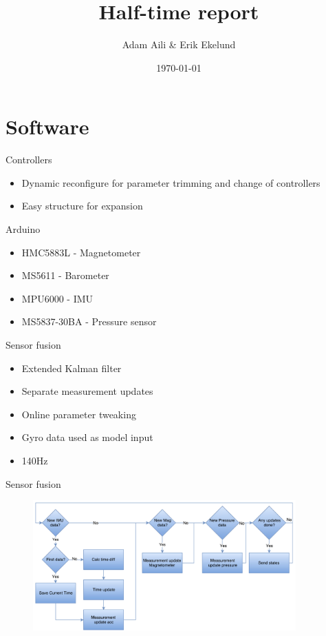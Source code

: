 \documentclass[11pt]{beamer}
\author{Adam Aili \& Erik Ekelund}
\title{Half-time report}
\date{\today}
\begin{document}
\begin{frame}
\titlepage
\end{frame}
\section{Software}
\begin{frame}{Controllers}
\begin{itemize}
\item Dynamic reconfigure for parameter trimming and change of controllers
\item Easy structure for expansion
\end{itemize}
\end{frame}

\begin{frame}{Arduino}
\begin{itemize}
\item HMC5883L - Magnetometer
\item MS5611 - Barometer
\item MPU6000 - IMU
\item MS5837-30BA - Pressure sensor
\end{itemize}
\end{frame}

\begin{frame}{Sensor fusion}
\begin{itemize}
\item Extended Kalman filter
\item Separate measurement updates
\item Online parameter tweaking
\item Gyro data used as model input
\item 140Hz
\end{itemize}
\end{frame}
\begin{frame}{Sensor fusion}
\begin{figure}
\includegraphics[width=0.9\textwidth]{fig/Fusion.pdf}
\end{figure}
\end{frame}
\end{document}
